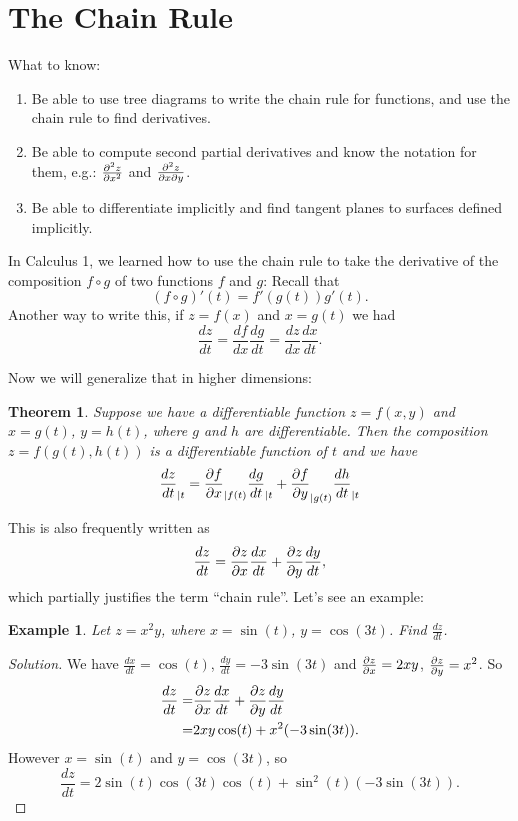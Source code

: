 \documentclass[12pt]{article}
\title{}
\newenvironment{solution}
  {\begin{proof}[Solution]}
  {\end{proof}
  
  }
\newtheorem{example}{Example}
\newtheorem{theorem}{Theorem}
\begin{document}
\section*{The Chain Rule}
What to know:
\begin{enumerate}
\item Be able to use tree diagrams to write the chain  rule for functions, and use the chain rule to find derivatives.
\item Be able to compute second partial derivatives and know the notation for them, e.g.: $\frac{\partial^2 z}{\partial x^2}$ and $\frac{\partial^2z }{\partial x\partial y}$.
\item Be able to differentiate implicitly and find tangent planes to surfaces defined implicitly.
\end{enumerate}


In Calculus 1, we learned how to use the chain rule to take the derivative of the composition $f\circ g$ of two functions $f$ and $g$: Recall that $$(f\circ g)'(t)=f'(g(t))g'(t).$$ Another way to write this, if $z=f(x)$ and $x=g(t)$ we had $$\frac{dz}{dt}=\frac{df}{dx}\frac{dg}{dt}=\frac{dz}{dx}\frac{dx}{dt}.$$

Now we will generalize that in higher dimensions: 
\begin{theorem} Suppose we have a differentiable function $z= f(x,y)$ and $x=g(t)$, $y=h(t)$, where $g$ and $h$ are differentiable. Then the composition $z=f(g(t),h(t))$ is a differentiable function of $t$ and we have 
$$\frac{d z}{dt}_{|t}=\frac{\partial f}{\partial x}_{|f(t)}\frac{d g}{dt}_{|t}+\frac{\partial f}{\partial y}_{|g(t)}\frac{d h}{dt}_{|t}$$
\end{theorem}
This is also frequently written as $$\frac{d z}{d t}=\frac{\partial z}{\partial x	}\frac{d x}{d t}+\frac{\partial z}{\partial y}\frac{d y}{d t},$$
which partially justifies the term ``chain rule''. Let's see an example:


\begin{example}  Let $z=x^2y$, where $x=\sin(t)$, $y=\cos(3t)$. Find $\frac{dz}{dt}$.
\end{example}
\begin{solution} We have $\frac{dx}{dt}=\cos(t)$, $\frac{dy}{dt}=-3\sin(3t)$ and $\frac{\partial z}{\partial x}=2xy$, $\frac{\partial z}{\partial	y}=x^2$. So \begin{align*}
\frac{d z}{d t}=&\frac{\partial z}{\partial x	}\frac{d x}{d t}+\frac{\partial z}{\partial y}\frac{d y}{dt}\\
=&2xy\cos(t)+x^2(-3\sin(3t)).
\end{align*} However $x=\sin(t)$ and $y=\cos(3t)$, so $$\frac{d z}{d t}=2\sin(t)\cos(3t)\cos(t)+\sin^2(t)(-3\sin(3t)).$$
\end{solution}
\end{document}
